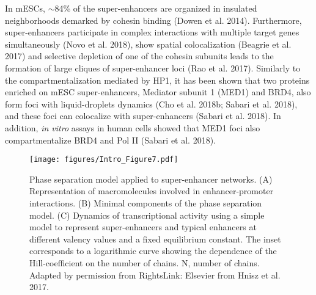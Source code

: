 In mESCs, $\sim$84\% of the super-enhancers are organized in insulated neighborhoods demarked by cohesin binding (Dowen et al. 2014). Furthermore, super-enhancers participate in complex interactions with multiple target genes simultaneously (Novo et al. 2018), show spatial colocalization (Beagrie et al. 2017) and selective depletion of one of the cohesin subunits leads to the formation of large cliques of super-enhancer loci (Rao et al. 2017). Similarly to the compartmentalization mediated by HP1, it has been shown that two proteins enriched on mESC super-enhancers, Mediator subunit 1 (MED1) and BRD4, also form foci with liquid-droplets dynamics (Cho et al. 2018b; Sabari et al. 2018), and these foci can colocalize with super-enhancers (Sabari et al. 2018). In addition, \textit{in vitro} assays in human cells showed that MED1 foci also compartmentalize BRD4 and Pol II (Sabari et al. 2018).\\


		\begin{figure}[h!]
			\centering
			\texttt{[image: figures/Intro\_Figure7.pdf]}
  			\caption[intro7]{Phase separation model applied to super-enhancer networks. (A) Representation of macromolecules involved in enhancer-promoter interactions. (B) Minimal components of the phase separation model. (C) Dynamics of transcriptional activity using a simple model to represent super-enhancers and typical enhancers at different valency values and a fixed equilibrium constant. The inset corresponds to a logarithmic curve showing the dependence of the Hill-coefficient on the number of chains. N, number of chains.  Adapted by permission from RightsLink: Elsevier from Hnisz et al. 2017.}
			\label{intro7}
		\end{figure}


